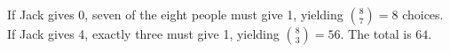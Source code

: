 If Jack gives 0, seven of the eight people must give 1, yielding $\binom87=8$ choices. If Jack gives 4, exactly three must give 1, yielding $\binom83=56$. The total is $\boxed{64}$.
